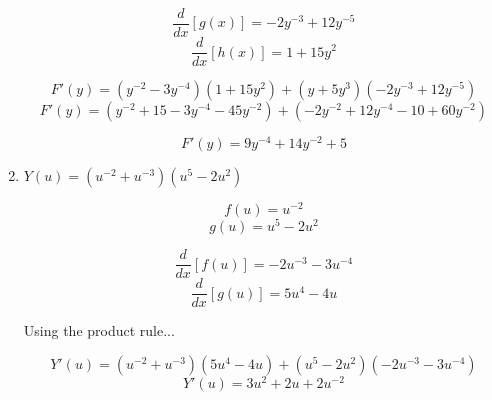 \documentclass{article}
\begin{document}
\begin{enumerate}
			$$\frac{d}{dx} [g(x)] = -2y^{-3} + 12y^{-5}$$
			$$\frac{d}{dx} [h(x)] = 1 + 15y^2$$

			$$F'(y) = (y^{-2} - 3y^{-4})(1 + 15y^2) + (y + 5y^{3})(-2y^{-3} + 12y^{-5})$$
			$$F'(y) = (y^{-2} + 15 - 3y^{-4} - 45y^{-2}) + (-2y^{-2} + 12y^{-4} - 10 + 60y^{-2})$$

			$$F'(y) = 9y^{-4} + 14y^{-2} + 5$$

		\item $Y(u) = (u^{-2} + u^{-3})(u^{5}-2u^{2})$

			$$f(u) = u^{-2}$$
			$$g(u) = u^{5} - 2u^{2}$$

			$$\frac{d}{dx} [f(u)] = -2u^{-3} - 3u^{-4}$$
			$$\frac{d}{dx} [g(u)] = 5u^4 - 4u$$

			Using the product rule...

			$$Y'(u) = (u^{-2} + u^{-3})(5u^{4} - 4u) + (u^5 - 2u^2)(-2u^{-3} - 3u^{-4})$$
			$$Y'(u) = 3u^2 + 2u + 2u^{-2}$$
	\end{enumerate}
\end{document}

